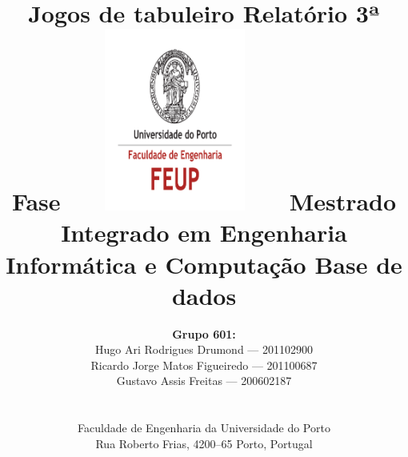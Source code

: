 \documentclass[a4paper]{article}
\begin{document}
\setlength{\textwidth}{16cm}
\setlength{\textheight}{22cm}

\title{\Huge\textbf{Jogos de tabuleiro}\linebreak\linebreak\linebreak
\Large\textbf{Relatório 3ª Fase}\linebreak\linebreak
\includegraphics[height=6cm, width=7cm]{feup.pdf}\linebreak \linebreak
\Large{Mestrado Integrado em Engenharia Informática e Computação} \linebreak \linebreak
\Large{Base de dados}\linebreak
}

\author{\textbf{Grupo 601:}\\ Hugo Ari Rodrigues Drumond --- 201102900 \\  Ricardo Jorge Matos Figueiredo --- 201100687 \\ Gustavo Assis Freitas --- 200602187\\\linebreak\linebreak \\
 \\ Faculdade de Engenharia da Universidade do Porto \\ Rua Roberto Frias, 4200--65 Porto, Portugal \linebreak\linebreak\linebreak
\linebreak\linebreak\vspace{1cm}}
\maketitle
\thispagestyle{empty}
\end{document}
